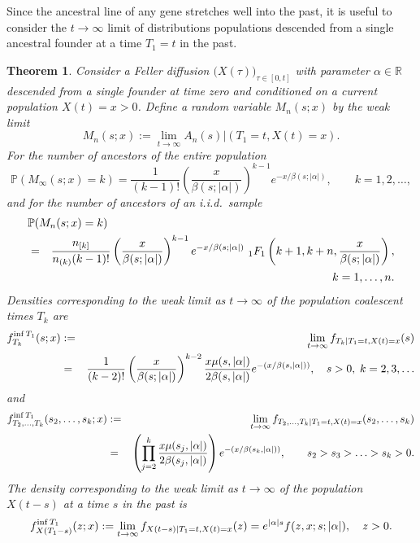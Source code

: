 \documentclass[preprint,12pt]{elsarticle}
\newtheorem{theorem}{Theorem}
\begin{document}
Since the ancestral line of any gene stretches well into the past, it is useful to consider the $t \to \infty$ limit of distributions 
populations descended from a single ancestral founder at a time $T_1 = t$ in the past.  
\begin{theorem}	\label{theorem:infT1Distribs}
Consider a Feller diffusion $\big(X(\tau)\big)_{\tau \in [0, t]}$ with parameter $\alpha \in \mathbb{R}$ descended from a single founder at time zero and conditioned on a current population $X(t) = x > 0$. Define a random variable $M_n(s; x)$ by the weak limit 
\[	
M_n(s; x) := \lim_{t \to \infty} A_n(s)|(T_1 = t, X(t) = x).  
\]
For the number of ancestors of the entire population 
\begin{equation}	\label{numberOfAncestors}
\mathbb{P}(M_\infty(s; x) = k) = \frac{1}{(k - 1)!} \left(\frac{x}{\beta(s; |\alpha|)}\right)^{k - 1} e^{-x/\beta(s; |\alpha|)}, \qquad k = 1, 2, \ldots,  
\end{equation}
and for the number of ancestors of an i.i.d.\ sample
\begin{eqnarray*}	\label{nAncestorsSample}
\lefteqn{\mathbb{P}(M_n(s; x) = k)} \nonumber \\
	& = & \frac{n_{[k]}}{n_{(k)} (k - 1)!}\left(\frac{x}{\beta(s; |\alpha|)}\right)^{k - 1} e^{-x/\beta(s; |\alpha|)}~_1F_1\left(k + 1, k + n, \frac{x}{\beta(s; |\alpha|)}\right), \nonumber \\
	& & 			\qquad\qquad\qquad\qquad\qquad\qquad\qquad\qquad\qquad\qquad\qquad\qquad	k = 1, \ldots, n.
\end{eqnarray*}
Densities corresponding to the weak limit as $t \to \infty$ of the population coalescent times $T_k$ are 
\begin{eqnarray}	\label{fTkInfT1}
f_{T_k}^{{\rm inf}\,T_1}(s; x) & := & \lim_{t \to \infty}f_{T_k \mid T_1 = t, X(t) = x}(s) \nonumber \\
	& = & \frac{1}{(k - 2)!}\left(\frac{x}{\beta(s; |\alpha|)}\right)^{k - 2} \frac{x \mu(s, |\alpha|)}{2\beta(s, |\alpha|)} e^{-(x/\beta(s, |\alpha|))}, 
					\quad s > 0,\; k = 2, 3, \ldots \nonumber \\
\end{eqnarray}
and
\begin{eqnarray}	\label{joint_fTkInfT1}
f_{T_2, \ldots, T_k}^{{\rm inf}\,T_1}(s_2, \ldots, s_k; x) & := & \lim_{t \to \infty}f_{T_2, \ldots, T_k \mid T_1 = t, X(t) = x}(s_2, \ldots, s_k) \nonumber \\ 
	& = & \left(\prod_{j = 2}^k \frac{x \mu(s_j, |\alpha|)}{2\beta(s_j, |\alpha|)} \right) e^{-(x/\beta(s_k, |\alpha|))},  \qquad s_2 > s_3 > \ldots > s_k > 0.  \nonumber \\
\end{eqnarray}
The density corresponding to the weak limit as $t \to \infty$ of the population $X(t - s)$ at a time $s$ in the past is 
\begin{equation}	\label{pastDensity}
f_{X(T_1 - s)}^{{\rm inf}\,T_1}(z; x) := \lim_{t \to \infty}f_{X(t - s) \mid T_1 = t, X(t) = x} (z) =  e^{|\alpha| s} f(z, x; s; |\alpha|), \quad z > 0.  
\end{equation}
\end{theorem}
\end{document}
